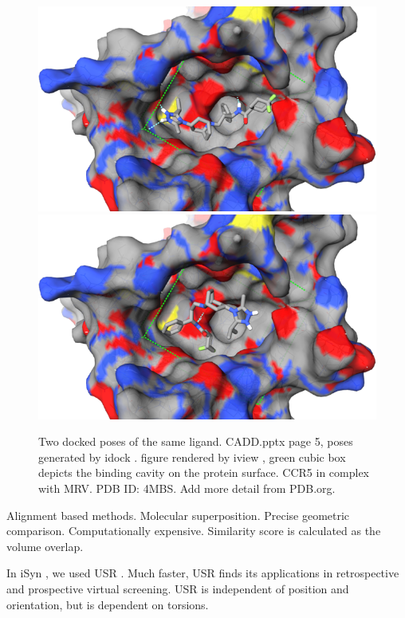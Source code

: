 \documentclass[twocolumn]{svjour3}          %
\begin{document}
\begin{figure}
\centering
\includegraphics[width=1.36\textwidth,natwidth=638,natheight=386]{../usrt/MRV0.png}
\endminipage
{}
\centering
\includegraphics[width=1.36\textwidth,natwidth=638,natheight=386]{../usrt/MRV1.png}
\endminipage
\caption{Two docked poses of the same ligand. CADD.pptx page 5, poses generated by idock \cite{1153}. figure rendered by iview \cite{1366}, green cubic box depicts the binding cavity on the protein surface. CCR5 in complex with MRV. PDB ID: 4MBS. Add more detail from PDB.org.}
\label{fig:MRV}
\end{figure}

Alignment based methods. Molecular superposition. Precise geometric comparison. Computationally expensive. Similarity score is calculated as the volume overlap.

In iSyn \cite{1381}, we used USR \cite{1379,1280}. Much faster, USR finds its applications in retrospective \cite{1332} and prospective \cite{1380} virtual screening. USR is independent of position and orientation, but is dependent on torsions.
\end{document}
